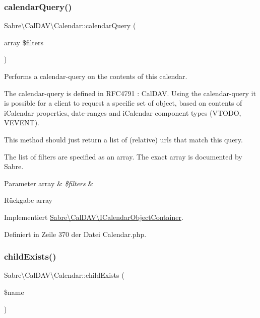 \subsubsection{\texorpdfstring{calendar\+Query()}{calendarQuery()}}
{\footnotesize\ttfamily Sabre\textbackslash{}\+Cal\+D\+A\+V\textbackslash{}\+Calendar\+::calendar\+Query (\begin{DoxyParamCaption}\item[{array}]{\$filters }\end{DoxyParamCaption})}

Performs a calendar-\/query on the contents of this calendar.

The calendar-\/query is defined in R\+F\+C4791 \+: Cal\+D\+AV. Using the calendar-\/query it is possible for a client to request a specific set of object, based on contents of i\+Calendar properties, date-\/ranges and i\+Calendar component types (V\+T\+O\+DO, V\+E\+V\+E\+NT).

This method should just return a list of (relative) urls that match this query.

The list of filters are specified as an array. The exact array is documented by Sabre.


\begin{DoxyParams}[1]{Parameter}
array & {\em \$filters} & \\
\hline
\end{DoxyParams}
\begin{DoxyReturn}{Rückgabe}
array 
\end{DoxyReturn}


Implementiert \mbox{\hyperlink{interface_sabre_1_1_cal_d_a_v_1_1_i_calendar_object_container_abb74b291f0e04c59cf0ca1003d21ba77}{Sabre\textbackslash{}\+Cal\+D\+A\+V\textbackslash{}\+I\+Calendar\+Object\+Container}}.



Definiert in Zeile 370 der Datei Calendar.\+php.

\mbox{\label{class_sabre_1_1_cal_d_a_v_1_1_calendar_a12d080fe5176db762382268f40f70c0f}} 
\subsubsection{\texorpdfstring{child\+Exists()}{childExists()}}
{\footnotesize\ttfamily Sabre\textbackslash{}\+Cal\+D\+A\+V\textbackslash{}\+Calendar\+::child\+Exists (\begin{DoxyParamCaption}\item[{}]{\$name }\end{DoxyParamCaption})}


